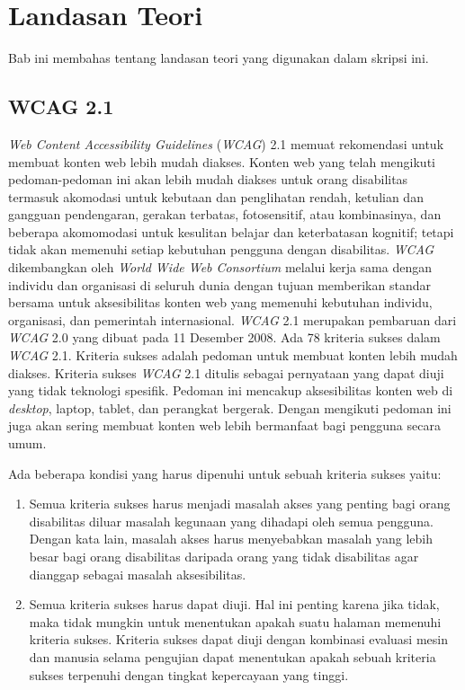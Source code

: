 \chapter{Landasan Teori}
\label{chap:teori}

Bab ini membahas tentang landasan teori yang digunakan dalam skripsi ini.

\section{WCAG 2.1}
\label{sec:WCAG2.1} 
\textit{Web Content Accessibility Guidelines} (\textit{WCAG}) 2.1 memuat rekomendasi untuk membuat konten web lebih mudah diakses. Konten web yang telah mengikuti pedoman-pedoman ini akan lebih mudah diakses untuk orang disabilitas termasuk akomodasi untuk kebutaan dan penglihatan rendah, ketulian dan gangguan pendengaran, gerakan terbatas, fotosensitif, atau kombinasinya, dan beberapa akomomodasi untuk kesulitan belajar dan keterbatasan kognitif; tetapi tidak akan memenuhi setiap kebutuhan pengguna dengan disabilitas. \textit{WCAG} dikembangkan oleh \textit{World Wide Web Consortium} melalui kerja sama dengan individu dan organisasi di seluruh dunia dengan tujuan memberikan standar bersama untuk aksesibilitas konten web yang memenuhi kebutuhan individu, organisasi, dan pemerintah internasional. \textit{WCAG} 2.1 merupakan pembaruan dari \textit{WCAG} 2.0 yang dibuat pada 11 Desember 2008. Ada 78 kriteria sukses dalam \textit{WCAG} 2.1. Kriteria sukses adalah pedoman untuk membuat konten lebih mudah diakses. Kriteria sukses \textit{WCAG} 2.1 ditulis sebagai pernyataan yang dapat diuji yang tidak teknologi spesifik. Pedoman ini mencakup aksesibilitas konten web di \textit{desktop}, laptop, tablet, dan perangkat bergerak. Dengan mengikuti pedoman ini juga akan sering membuat konten web lebih bermanfaat bagi pengguna secara umum.

Ada beberapa kondisi yang harus dipenuhi untuk sebuah kriteria sukses yaitu:

\begin{enumerate}
	\item Semua kriteria sukses harus menjadi masalah akses yang penting bagi orang disabilitas diluar masalah kegunaan yang dihadapi oleh semua pengguna. Dengan kata lain, masalah akses harus menyebabkan masalah yang lebih besar bagi orang disabilitas daripada orang yang tidak disabilitas agar dianggap sebagai masalah aksesibilitas.
	\item Semua kriteria sukses harus dapat diuji. Hal ini penting karena jika tidak, maka tidak mungkin untuk menentukan apakah suatu halaman memenuhi kriteria sukses. Kriteria sukses dapat diuji dengan kombinasi evaluasi mesin dan manusia selama pengujian dapat menentukan apakah sebuah kriteria sukses terpenuhi dengan tingkat kepercayaan yang tinggi.
\end{enumerate}

